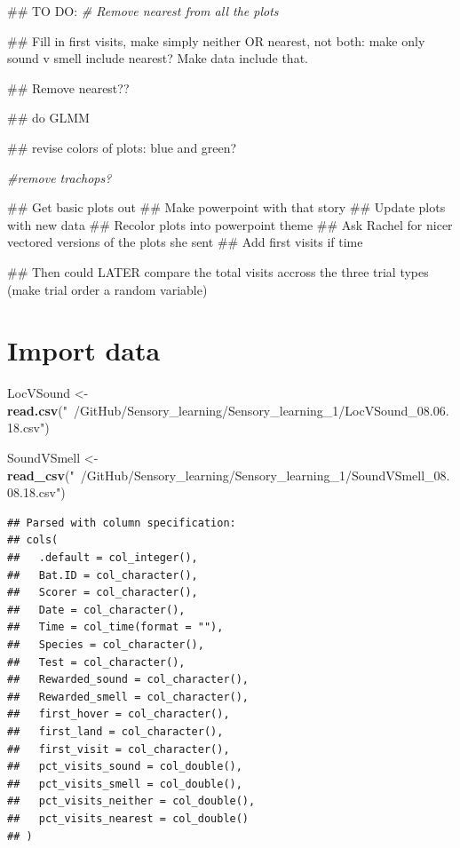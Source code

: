 \documentclass[]{article}
\newenvironment{Shaded}{\begin{snugshade}}{\end{snugshade}}
\newcommand{\KeywordTok}[1]{\textcolor[rgb]{0.13,0.29,0.53}{\textbf{{#1}}}}
\newcommand{\StringTok}[1]{\textcolor[rgb]{0.31,0.60,0.02}{{#1}}}
\newcommand{\CommentTok}[1]{\textcolor[rgb]{0.56,0.35,0.01}{\textit{{#1}}}}
\newcommand{\NormalTok}[1]{{#1}}
\begin{document}
\begin{Shaded}
\begin{Highlighting}[]
\NormalTok{## TO DO: }
\CommentTok{# Remove nearest from all the plots}

\NormalTok{## Fill in first visits, make simply neither OR nearest, not both: make only sound v smell include nearest? Make data include that. }

\NormalTok{## Remove nearest??}

\NormalTok{## do GLMM}

\NormalTok{## revise colors of plots: blue and green?}

\CommentTok{#remove trachops?}

\NormalTok{## Get basic plots out}
\NormalTok{## Make powerpoint with that story}
\NormalTok{## Update plots with new data}
\NormalTok{## Recolor plots into powerpoint theme}
\NormalTok{## Ask Rachel for nicer vectored versions of the plots she sent}
\NormalTok{## Add first visits if time}





\NormalTok{## Then could LATER compare the total visits accross the three trial types (make trial order a random variable)}
\end{Highlighting}
\end{Shaded}

\section{Import data}\label{import-data}

\begin{Shaded}
\begin{Highlighting}[]
\NormalTok{LocVSound <-}\StringTok{ }\KeywordTok{read.csv}\NormalTok{(}\StringTok{"~/GitHub/Sensory_learning/Sensory_learning_1/LocVSound_08.06.18.csv"}\NormalTok{)}

\NormalTok{SoundVSmell <-}\StringTok{ }\KeywordTok{read_csv}\NormalTok{(}\StringTok{"~/GitHub/Sensory_learning/Sensory_learning_1/SoundVSmell_08.08.18.csv"}\NormalTok{)}
\end{Highlighting}
\end{Shaded}

\begin{verbatim}
## Parsed with column specification:
## cols(
##   .default = col_integer(),
##   Bat.ID = col_character(),
##   Scorer = col_character(),
##   Date = col_character(),
##   Time = col_time(format = ""),
##   Species = col_character(),
##   Test = col_character(),
##   Rewarded_sound = col_character(),
##   Rewarded_smell = col_character(),
##   first_hover = col_character(),
##   first_land = col_character(),
##   first_visit = col_character(),
##   pct_visits_sound = col_double(),
##   pct_visits_smell = col_double(),
##   pct_visits_neither = col_double(),
##   pct_visits_nearest = col_double()
## )
\end{verbatim}
\end{document}
